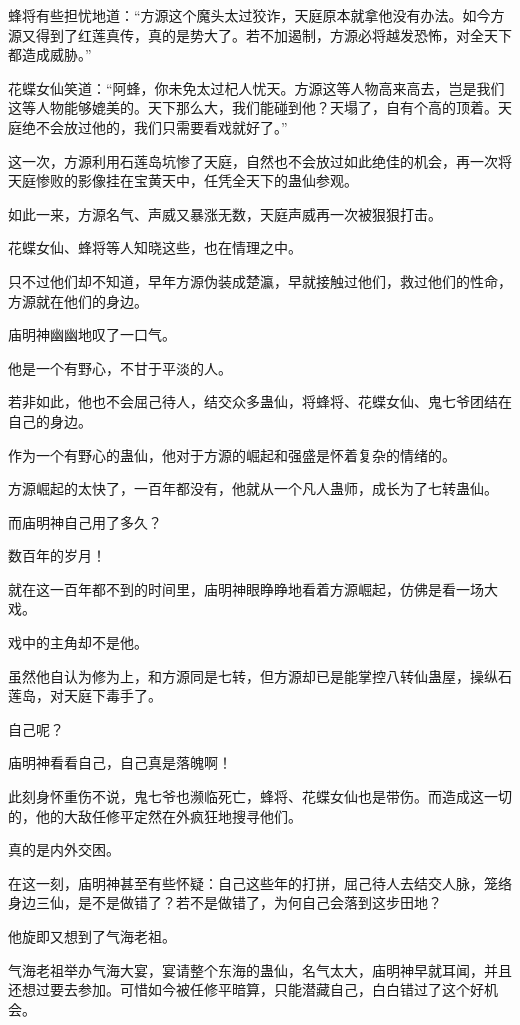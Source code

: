 \begin{this_body}
蜂将有些担忧地道：“方源这个魔头太过狡诈，天庭原本就拿他没有办法。如今方源又得到了红莲真传，真的是势大了。若不加遏制，方源必将越发恐怖，对全天下都造成威胁。”

花蝶女仙笑道：“阿蜂，你未免太过杞人忧天。方源这等人物高来高去，岂是我们这等人物能够媲美的。天下那么大，我们能碰到他？天塌了，自有个高的顶着。天庭绝不会放过他的，我们只需要看戏就好了。”

这一次，方源利用石莲岛坑惨了天庭，自然也不会放过如此绝佳的机会，再一次将天庭惨败的影像挂在宝黄天中，任凭全天下的蛊仙参观。

如此一来，方源名气、声威又暴涨无数，天庭声威再一次被狠狠打击。

花蝶女仙、蜂将等人知晓这些，也在情理之中。

只不过他们却不知道，早年方源伪装成楚瀛，早就接触过他们，救过他们的性命，方源就在他们的身边。

庙明神幽幽地叹了一口气。

他是一个有野心，不甘于平淡的人。

若非如此，他也不会屈己待人，结交众多蛊仙，将蜂将、花蝶女仙、鬼七爷团结在自己的身边。

作为一个有野心的蛊仙，他对于方源的崛起和强盛是怀着复杂的情绪的。

方源崛起的太快了，一百年都没有，他就从一个凡人蛊师，成长为了七转蛊仙。

而庙明神自己用了多久？

数百年的岁月！

就在这一百年都不到的时间里，庙明神眼睁睁地看着方源崛起，仿佛是看一场大戏。

戏中的主角却不是他。

虽然他自认为修为上，和方源同是七转，但方源却已是能掌控八转仙蛊屋，操纵石莲岛，对天庭下毒手了。

自己呢？

庙明神看看自己，自己真是落魄啊！

此刻身怀重伤不说，鬼七爷也濒临死亡，蜂将、花蝶女仙也是带伤。而造成这一切的，他的大敌任修平定然在外疯狂地搜寻他们。

真的是内外交困。

在这一刻，庙明神甚至有些怀疑：自己这些年的打拼，屈己待人去结交人脉，笼络身边三仙，是不是做错了？若不是做错了，为何自己会落到这步田地？

他旋即又想到了气海老祖。

气海老祖举办气海大宴，宴请整个东海的蛊仙，名气太大，庙明神早就耳闻，并且还想过要去参加。可惜如今被任修平暗算，只能潜藏自己，白白错过了这个好机会。


\end{this_body}
